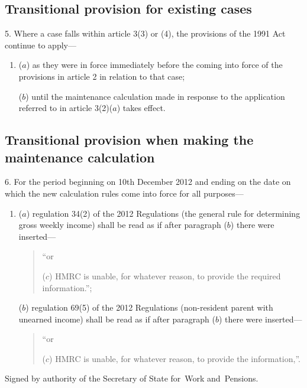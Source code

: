 \documentclass[12pt,a4paper]{article}
\begin{document}
\subsection[5. Transitional provision for existing cases]{Transitional provision for existing cases}

5.  Where a case falls within article 3(3) or (4), the provisions of the 1991 Act continue to apply—
\begin{enumerate}\item[]
($a$) as they were in force immediately before the coming into force of the provisions in article 2 in relation to that case;

($b$) until the maintenance calculation made in response to the application referred to in article 3(2)($a$)  takes effect.
\end{enumerate}

\subsection[6. Transitional provision when making the maintenance calculation]{Transitional provision when making the maintenance calculation}

6.  For the period beginning on 10th December 2012 and ending on the date on which the new calculation rules come into force for all purposes—
\begin{enumerate}\item[]
($a$) regulation 34(2) of the 2012 Regulations (the general rule for determining gross weekly income) shall be read as if after paragraph ($b$)  there were inserted—
\begin{quotation}
“or

($c$) HMRC is unable, for whatever reason, to provide the required information.”;
\end{quotation}

($b$) regulation 69(5) of the 2012 Regulations (non-resident parent with unearned income) shall be read as if after paragraph ($b$)  there were inserted—
\begin{quotation}
“or

($c$) HMRC is unable, for whatever reason, to provide the information,”.
\end{quotation}
\end{enumerate}

\bigskip

\pagebreak[3]

Signed 
by authority of the 
Secretary of State for~Work and~Pensions.
\end{document}
